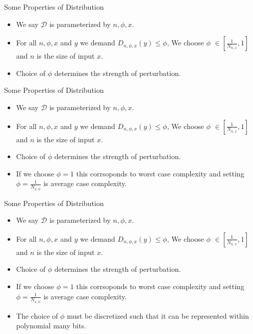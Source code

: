 \begin{frame}{Some Properties of Distribution}
    \begin{itemize}
        \item We say $\mathcal{D}$ is parameterized by $n, \phi, x$.
        \item For all $n, \phi, x$ and $y$ we demand $D_{n, \phi, x}(y) \leq \phi$,
        We choose $\phi$ $\in [\frac{1}{N_{n, x}}, 1]$ and $n$ is the size of input $x$.
        \item Choice of $\phi$ determines the strength of perturbation.
    \end{itemize}
\end{frame}

\begin{frame}{Some Properties of Distribution}
    \begin{itemize}
        \item We say $\mathcal{D}$ is parameterized by $n, \phi, x$.
        \item For all $n, \phi, x$ and $y$ we demand $D_{n, \phi, x}(y) \leq \phi$,
        We choose $\phi$ $\in [\frac{1}{N_{n, x}}, 1]$ and $n$ is the size of input $x$.
        \item Choice of $\phi$ determines the strength of perturbation.
        \item If we choose $\phi = 1$ this corrsoponds to worst case complexity and setting $\phi = \frac{1}{N_{x, \phi}}$ is average case complexity. 
    \end{itemize}
\end{frame}

\begin{frame}{Some Properties of Distribution}
    \begin{itemize}
        \item We say $\mathcal{D}$ is parameterized by $n, \phi, x$.
        \item For all $n, \phi, x$ and $y$ we demand $D_{n, \phi, x}(y) \leq \phi$,
        We choose $\phi$ $\in [\frac{1}{N_{n, x}}, 1]$ and $n$ is the size of input $x$.
        \item Choice of $\phi$ determines the strength of perturbation.
        \item If we choose $\phi = 1$ this corrsoponds to worst case complexity and setting $\phi = \frac{1}{N_{x, \phi}}$ is average case complexity. 
        \item The choice of $\phi$ must be discretized such that it can be represented within polynomial many bits.
    \end{itemize}
\end{frame}


